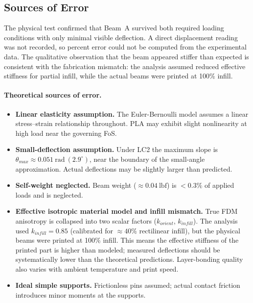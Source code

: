 \documentclass[11pt,letterpaper]{article}
\begin{document}
\subsection{Sources of Error}

The physical test confirmed that Beam~A survived both required loading
conditions with only minimal visible deflection.  A direct displacement reading
was not recorded, so percent error could not be computed from the experimental
data.  The qualitative observation that the beam appeared stiffer than expected
is consistent with the fabrication mismatch: the analysis assumed reduced
effective stiffness for partial infill, while the actual beams were printed at
100\% infill.

\paragraph{Theoretical sources of error.}
\begin{itemize}[noitemsep]
  \item \textbf{Linear elasticity assumption.}  The Euler-Bernoulli model
    assumes a linear stress--strain relationship throughout.  PLA may
    exhibit slight nonlinearity at high load near the governing FoS.
  \item \textbf{Small-deflection assumption.}  Under LC2 the maximum slope
    is $\theta_{max} \approx 0.051\ \mathrm{rad}\ (2.9^\circ)$, near the
    boundary of the small-angle approximation.  Actual deflections may be
    slightly larger than predicted.
  \item \textbf{Self-weight neglected.}  Beam weight ($\approx 0.04\ \mathrm{lbf}$)
    is $< 0.3\%$ of applied loads and is neglected.
  \item \textbf{Effective isotropic material model and infill mismatch.}
    True FDM anisotropy is collapsed into two scalar factors ($k_{orient}$,
    $k_{infill}$).  The analysis used $k_{infill} = 0.85$ (calibrated for
    $\approx 40\%$ rectilinear infill), but the physical beams were printed
    at 100\% infill.  This means the effective stiffness of the printed part
    is higher than modeled; measured deflections should be systematically
    lower than the theoretical predictions.
    Layer-bonding quality also varies with ambient temperature and print speed.
  \item \textbf{Ideal simple supports.}  Frictionless pins assumed;
    actual contact friction introduces minor moments at the supports.
\end{itemize}
\end{document}
